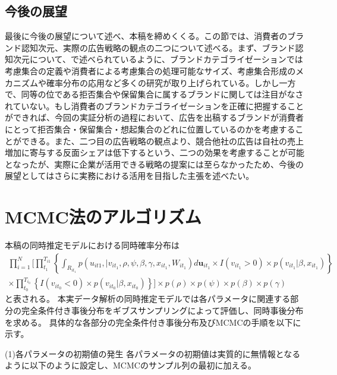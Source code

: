 \documentclass[11pt]{jsarticle}
\begin{document}
\subsection{今後の展望}
\label{sec:suggestion}
最後に今後の展望について述べ、本稿を締めくくる。この節では、消費者のブランド認知次元、実際の広告戦略の観点の二つについて述べる。まず、ブランド認知次元について、\citet{urano2012}で述べられているように、ブランドカテゴライゼーションでは考慮集合の定義や消費者による考慮集合の処理可能なサイズ、考慮集合形成のメカニズムや確率分布の応用など多くの研究が取り上げられている。しかし一方で、同等の位である拒否集合や保留集合に属するブランドに関しては注目がなされていない。もし消費者のブランドカテゴライゼーションを正確に把握することができれば、今回の実証分析の過程において、広告を出稿するブランドが消費者にとって拒否集合・保留集合・想起集合のどれに位置しているのかを考慮することができる。また、二つ目の広告戦略の観点より、競合他社の広告は自社の売上増加に寄与する反面シェアは低下するという、二つの効果を考慮することが可能となったが、実際に企業が活用できる戦略の提案には至らなかったため、今後の展望としてはさらに実務における活用を目指した主張を述べたい。

\nocite{*}

\newpage
\appendix %

\section{MCMC法のアルゴリズム}
本稿の同時推定モデルにおける同時確率分布は
\begin{equation} \label{formula32}
\begin{split}
 \prod_{i=1}^{N}\Biggl[
  \prod_{t_{1}}^{T_{i1}} \left\{
   \int_{R_{it_{1}}} p(u_{it1},|v_{it_{1}},\rho,\psi,\beta,\gamma,x_{it_{1}}, W_{it_{1}})
   d {\boldsymbol u}_{it_{1}} \times I(v_{it_{1}}>0) \times p(v_{it_{1}}|\beta,x_{it_{1}})  
  \right\} \\
  \times \prod_{t_{0}}^{T_{i_{0}}}\left\{
   I(v_{it_{0}}<0)×p(v_{it_{0}}|\beta,x_{it_{0}})
  \right\}
 \Biggr]
 ×p(\rho)×p(\psi)×p(\beta)×p(\gamma)
\end{split}
\end{equation}
と表される。
本実データ解析の同時推定モデルでは各パラメータに関連する部分の完全条件付き事後分布をギブスサンプリングによって評価し、同時事後分布を求める。
具体的な各部分の完全条件付き事後分布及びMCMCの手順を以下に示す。

(1)各パラメータの初期値の発生
各パラメータの初期値は実質的に無情報となるように以下のように設定し、MCMCのサンプル列の最初に加える。
\end{document}
